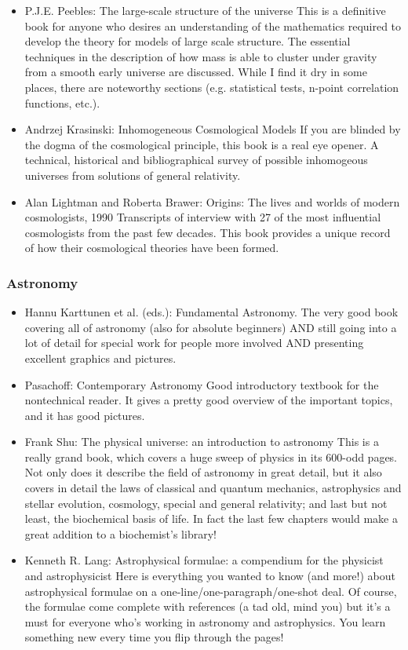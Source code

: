 \documentclass[10pt,a4paper]{book}
\theoremstyle{definition}
\begin{document}
\begin{itemize}
\item P.J.E. Peebles: The large-scale structure of the universe
This is a definitive book for anyone who desires an understanding of the mathematics required to develop the theory for models of large scale structure.  The essential techniques in the description of how mass is able to cluster under gravity from a smooth early universe are discussed.  While I find it dry in some places, there are noteworthy sections (e.g. statistical tests, n-point correlation functions, etc.).
\item Andrzej Krasinski: Inhomogeneous Cosmological Models
If you are blinded by the dogma of the cosmological principle, this book is a real eye opener.  A technical, historical and bibliographical survey of possible inhomogeous universes from solutions of general relativity.
\item Alan Lightman and Roberta Brawer: Origins: The lives and worlds of modern cosmologists, 1990
Transcripts of interview with 27 of the most influential cosmologists from the past few decades.  This book provides a unique record of how their cosmological theories have been formed.
\end{itemize}


\subsubsection{Astronomy}
\begin{itemize}
\item Hannu Karttunen et al. (eds.): Fundamental Astronomy.
The very good book covering all of astronomy (also for absolute beginners) AND still going into a lot of detail for special work for people more involved AND presenting excellent graphics and pictures.
\item Pasachoff: Contemporary Astronomy
Good introductory textbook for the nontechnical reader.  It gives a pretty good overview of the important topics, and it has good pictures.
\item Frank Shu: The physical universe: an introduction to astronomy
This is a really grand book, which covers a huge sweep of physics in its 600-odd pages.  Not only does it describe the field of astronomy in great detail, but it also covers in detail the laws of classical and quantum mechanics, astrophysics and stellar evolution, cosmology, special and general relativity; and last but not least, the biochemical basis of life.  In fact the last few chapters would make a great addition to a biochemist's library!
\item Kenneth R. Lang: Astrophysical formulae: a compendium for the physicist and astrophysicist
Here is everything you wanted to know (and more!) about astrophysical formulae on a one-line/one-paragraph/one-shot deal.  Of course, the formulae come complete with references (a tad old, mind you) but it's a must for everyone who's working in astronomy and astrophysics.  You learn something new every time you flip through the pages!
\end{itemize}
\end{document}
